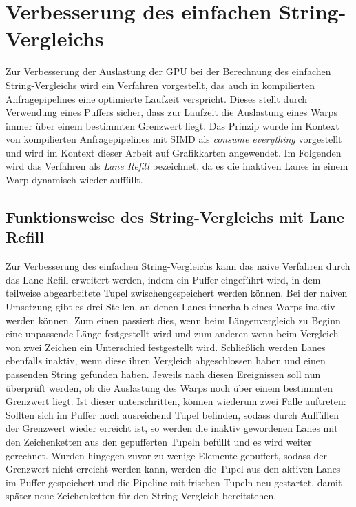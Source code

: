 \chapter{Verbesserung des einfachen String-Vergleichs}
\label{sec:equals_lane_refill}

Zur Verbesserung der Auslastung der GPU bei der Berechnung des einfachen String-Vergleichs wird ein Verfahren vorgestellt, das auch in kompilierten Anfragepipelines eine optimierte Laufzeit verspricht.
Dieses stellt durch Verwendung eines Puffers sicher, dass zur Laufzeit die Auslastung eines Warps immer über einem bestimmten Grenzwert liegt.
Das Prinzip wurde im Kontext von kompilierten Anfragepipelines mit SIMD als \emph{consume everything} vorgestellt \cite{Lang2018} und wird im Kontext dieser Arbeit auf Grafikkarten angewendet.
Im Folgenden wird das Verfahren als \emph{Lane Refill} bezeichnet, da es die inaktiven Lanes in einem Warp dynamisch wieder auffüllt.

\section{Funktionsweise des String-Vergleichs mit Lane Refill}
\label{sec:equals_lane_refill_funktionsweise}

Zur Verbesserung des einfachen String-Vergleichs kann das naive Verfahren durch das Lane Refill erweitert werden, indem ein Puffer eingeführt wird, in dem teilweise abgearbeitete Tupel zwischengespeichert werden können.
Bei der naiven Umsetzung gibt es drei Stellen, an denen Lanes innerhalb eines Warps inaktiv werden können.
Zum einen passiert dies, wenn beim Längenvergleich zu Beginn eine unpassende Länge festgestellt wird und zum anderen wenn beim Vergleich von zwei Zeichen ein Unterschied festgestellt wird.
Schließlich werden Lanes ebenfalls inaktiv, wenn diese ihren Vergleich abgeschlossen haben und einen passenden String gefunden haben.
Jeweils nach diesen Ereignissen soll nun überprüft werden, ob die Auslastung des Warps noch über einem bestimmten Grenzwert liegt.
Ist dieser unterschritten, können wiederum zwei Fälle auftreten:
Sollten sich im Puffer noch ausreichend Tupel befinden, sodass durch Auffüllen der Grenzwert wieder erreicht ist, so werden die inaktiv gewordenen Lanes mit den Zeichenketten aus den gepufferten Tupeln befüllt und es wird weiter gerechnet.
Wurden hingegen zuvor zu wenige Elemente gepuffert, sodass der Grenzwert nicht erreicht werden kann, werden die Tupel aus den aktiven Lanes im Puffer gespeichert und die Pipeline mit frischen Tupeln neu gestartet, damit später neue Zeichenketten für den String-Vergleich bereitstehen.

